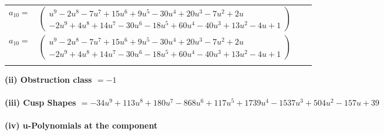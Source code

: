 \documentclass[1p]{elsarticle_modified}
\theoremstyle{definition}
\begin{document}
\begin{tabular}{m{7pt} m{180pt} m{7pt} m{180pt} }
\flushright $a_{10}=$&$\begin{pmatrix}u^9-2 u^8-7 u^7+15 u^6+9 u^5-30 u^4+20 u^3-7 u^2+2 u\\-2 u^9+4 u^8+14 u^7-30 u^6-18 u^5+60 u^4-40 u^3+13 u^2-4 u+1\end{pmatrix}$\\ \flushright $a_{10}=$&$\begin{pmatrix}u^9-2 u^8-7 u^7+15 u^6+9 u^5-30 u^4+20 u^3-7 u^2+2 u\\-2 u^9+4 u^8+14 u^7-30 u^6-18 u^5+60 u^4-40 u^3+13 u^2-4 u+1\end{pmatrix}$\\&\end{tabular}
\flushleft \textbf{(ii) Obstruction class $= -1$}\\~\\
\flushleft \textbf{(iii) Cusp Shapes $= -34 u^9+113 u^8+180 u^7-868 u^6+117 u^5+1739 u^4-1537 u^3+504 u^2-157 u+39$}\\~\\
\newpage\renewcommand{\arraystretch}{1}
\flushleft \textbf{(iv) u-Polynomials at the component}\newline \\
\end{document}

